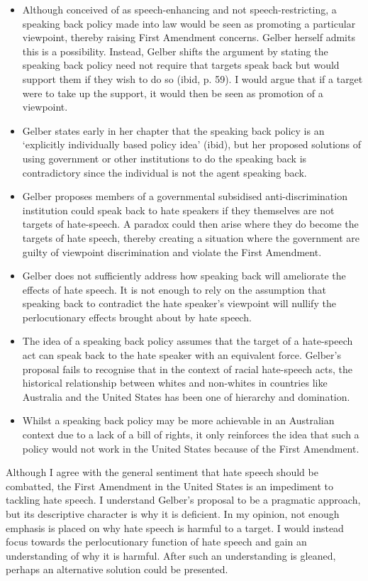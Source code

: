 \documentclass{article}
\begin{document}
\begin{itemize}
    \item Although conceived of as speech-enhancing and not speech-restricting, a speaking back policy made into law would be seen as promoting a particular viewpoint, thereby raising First Amendment concerns. Gelber herself admits this is a possibility. Instead, Gelber shifts the argument by stating the speaking back policy need not require that targets speak back but would support them if they wish to do so (ibid, p. 59). I would argue that if a target were to take up the support, it would then be seen as promotion of a viewpoint.
    \item Gelber states early in her chapter that the speaking back policy is an ‘explicitly individually based policy idea’ (ibid), but her proposed solutions of using government or other institutions to do the speaking back is contradictory since the individual is not the agent speaking back.
    \item Gelber proposes members of a governmental subsidised anti-discrimination institution could speak back to hate speakers if they themselves are not targets of hate-speech. A paradox could then arise where they do become the targets of hate speech, thereby creating a situation where the government are guilty of viewpoint discrimination and violate the First Amendment.
    \item Gelber does not sufficiently address how speaking back will ameliorate the effects of hate speech. It is not enough to rely on the assumption that speaking back to contradict the hate speaker’s viewpoint will nullify the perlocutionary effects brought about by hate speech.
    \item The idea of a speaking back policy assumes that the target of a hate-speech act can speak back to the hate speaker with an equivalent force. Gelber’s proposal fails to recognise that in the context of racial hate-speech acts, the historical relationship between whites and non-whites in countries like Australia and the United States has been one of hierarchy and domination.
    \item Whilst a speaking back policy may be more achievable in an Australian context due to a lack of a bill of rights, it only reinforces the idea that such a policy would not work in the United States because of the First Amendment.
\end{itemize}

Although I agree with the general sentiment that hate speech should be combatted, the First Amendment in the United States is an impediment to tackling hate speech. I understand Gelber’s proposal to be a pragmatic approach, but its descriptive character is why it is deficient. In my opinion, not enough emphasis is placed on why hate speech is harmful to a target. I would instead focus towards the perlocutionary function of hate speech and gain an understanding of why it is harmful. After such an understanding is gleaned, perhaps an alternative solution could be presented.
\end{document}
